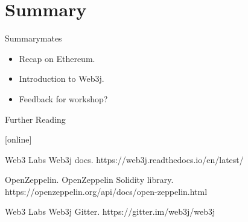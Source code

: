 \documentclass{beamer}
\begin{document}
\section*{Summary}

\begin{frame}{Summary}mates
  \begin{itemize}
  \item
    Recap on \alert{Ethereum}.
  \item
    Introduction to \alert{Web3j}.
  \end{itemize}
  
  \begin{itemize}
  \item
    Feedback for workshop?
  \end{itemize}
\end{frame}



\appendix

\begin{frame}{Further Reading}
    
  \begin{thebibliography}{1}
  [online]
  
		Web3 Labs
	    \newblock Web3j docs.
	    \newblock https://web3j.readthedocs.io/en/latest/
	    
		OpenZeppelin.
	    \newblock OpenZeppelin Solidity library.
	    \newblock https://openzeppelin.org/api/docs/open-zeppelin.html
	    
	    Web3 Labs
	    \newblock Web3j Gitter.
	    \newblock https://gitter.im/web3j/web3j
  
  \end{thebibliography}
\end{frame}
\end{document}
